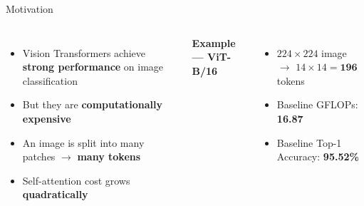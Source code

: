 \documentclass[aspectratio=169, 11pt]{beamer}
\begin{document}
\begin{frame}{Motivation}
\begin{columns}[T]
\begin{itemize}
  \item Vision Transformers achieve \textbf{strong performance} on image classification
  \item But they are \textbf{computationally expensive}
  \item An image is split into many patches $\rightarrow$ \textbf{many tokens}
  \item Self-attention cost grows \textbf{quadratically}
\end{itemize}

\vspace{0.4cm}
\textbf{Example — ViT-B/16}
\begin{itemize}
  \item $224 \times 224$ image $\rightarrow$ $14 \times 14 = \mathbf{196}$ tokens
  \item Baseline GFLOPs: \textbf{16.87}
  \item Baseline Top-1 Accuracy: \textbf{95.52\%}
\end{itemize}

\end{columns}
\end{frame}
\end{document}
